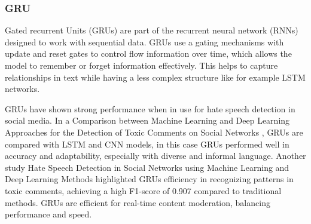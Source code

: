 \subsubsection{GRU}

\noindent
Gated recurrent Units (GRUs) are part of the recurrent neural network (RNNs) designed to work with sequential data. GRUs use a gating mechanisms with update and reset gates to control flow information over time, which allows the model to remember or forget information effectively. This helps to capture relationships in text while having a less complex structure like for example LSTM networks.

GRUs have shown strong performance when in use for hate speech detection in social media. In a Comparison between Machine Learning and Deep Learning Approaches for the Detection of Toxic Comments on Social Networks \citep{bonetti2023comparison}, GRUs are compared with LSTM and CNN models, in this case GRUs performed well in accuracy and adaptability, especially with diverse and informal language. Another study Hate Speech Detection in Social Networks using Machine Learning and Deep Learning Methods \citep{faisal2023hate} highlighted GRUs efficiency in recognizing patterns in toxic comments, achieving a high F1-score of 0.907 compared to traditional methods. GRUs are efficient for real-time content moderation, balancing performance and speed.
